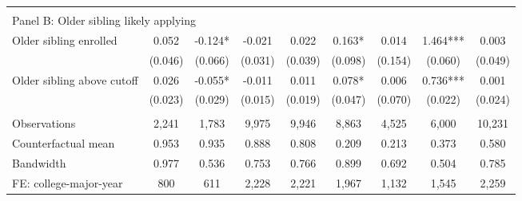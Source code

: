 {{\begin{tabular}{lcccccccc}
&  &  &  & & & & & &    \\
\multicolumn{9}{l}{Panel B: Older sibling likely applying} \\
Older sibling enrolled&       0.052   &      -0.124*  &      -0.021   &       0.022   &       0.163*  &       0.014   &       1.464***&       0.003   \\
                    &     (0.046)   &     (0.066)   &     (0.031)   &     (0.039)   &     (0.098)   &     (0.154)   &     (0.060)   &     (0.049)   \\
 
Older sibling above cutoff&       0.026   &      -0.055*  &      -0.011   &       0.011   &       0.078*  &       0.006   &       0.736***&       0.001   \\
                    &     (0.023)   &     (0.029)   &     (0.015)   &     (0.019)   &     (0.047)   &     (0.070)   &     (0.022)   &     (0.024)   \\
                    &               &               &               &               &               &               &               &               \\
Observations        &       2,241   &       1,783   &       9,975   &       9,946   &       8,863   &       4,525   &       6,000   &      10,231   \\
Counterfactual mean &       0.953   &       0.935   &       0.888   &       0.808   &       0.209   &       0.213   &       0.373   &       0.580   \\
Bandwidth           &       0.977   &       0.536   &       0.753   &       0.766   &       0.899   &       0.692   &       0.504   &       0.785   \\
FE: college-major-year&         800   &         611   &       2,228   &       2,221   &       1,967   &       1,132   &       1,545   &       2,259   \\
 

\bottomrule
\end{tabular}
}
}
